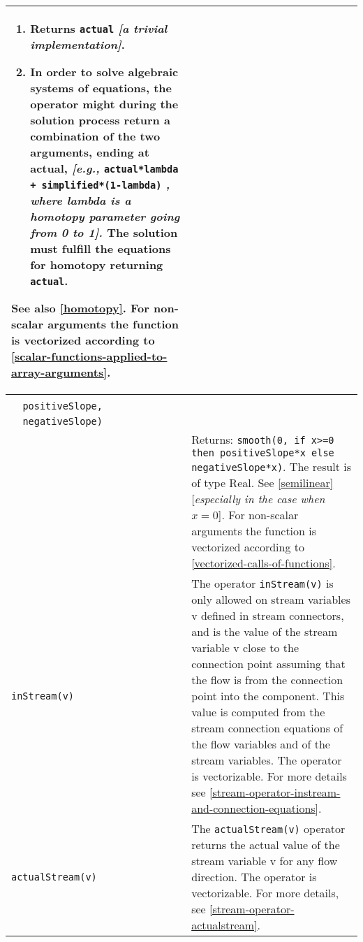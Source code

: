 \begin{longtable}{|p{5.1cm}|p{8cm}|}
\begin{enumerate}
\item
  Returns \lstinline!actual! \emph{{[}a trivial implementation{]}}.
\item
  In order to solve algebraic systems of equations, the operator might
  during the solution process return a combination of the two arguments,
  ending at actual, \emph{{[}e.g.,}
  \lstinline!actual*lambda + simplified*(1-lambda)! \emph{,
  where lambda is a homotopy parameter going from 0 to 1{]}.}
  The solution must fulfill the equations for homotopy returning
  \lstinline!actual!.
\end{enumerate}

See also \autoref{homotopy}. For non-scalar arguments the function is
vectorized according to \autoref{scalar-functions-applied-to-array-arguments}.\\
\hline

\begin{tabular}{@{}p{5.1cm}@{}}
\lstinline!semiLinear(x,!\\
\lstinline!  positiveSlope,!\\
\lstinline!  negativeSlope)!\\
\end{tabular}&
Returns:
\lstinline!smooth(0, if x>=0 then positiveSlope*x else negativeSlope*x)!.
The result is of type Real. See \autoref{semilinear} {[}\emph{especially in
the case when $x = 0$}{]}\emph{.} For non-scalar arguments the function is
vectorized according to \autoref{vectorized-calls-of-functions}.\\
\hline

\lstinline!inStream(v)! & The operator \lstinline!inStream(v)! is only allowed on stream
variables v defined in stream connectors, and is the value of the stream
variable v close to the connection point assuming that the flow is from
the connection point into the component. This value is computed from the
stream connection equations of the flow variables and of the stream
variables. The operator is vectorizable. For more details see \autoref{stream-operator-instream-and-connection-equations}.\\
\hline

\lstinline!actualStream(v)! & The \lstinline!actualStream(v)! operator returns the actual value
of the stream variable v for any flow direction. The operator is
vectorizable. For more details, see \autoref{stream-operator-actualstream}.\\
\hline


\end{longtable}
